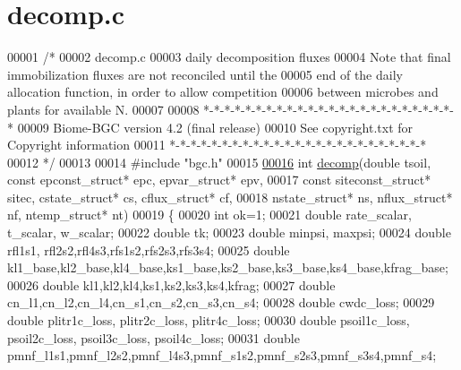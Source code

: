 \hypertarget{decomp_8c_source}{}\section{decomp.\+c}
\label{decomp_8c_source}

\begin{DoxyCode}
00001 \textcolor{comment}{/* }
00002 \textcolor{comment}{decomp.c}
00003 \textcolor{comment}{daily decomposition fluxes}
00004 \textcolor{comment}{Note that final immobilization fluxes are not reconciled until the}
00005 \textcolor{comment}{end of the daily allocation function, in order to allow competition}
00006 \textcolor{comment}{between microbes and plants for available N.}
00007 \textcolor{comment}{}
00008 \textcolor{comment}{*-*-*-*-*-*-*-*-*-*-*-*-*-*-*-*-*-*-*-*-*-*-*-*-*}
00009 \textcolor{comment}{Biome-BGC version 4.2 (final release)}
00010 \textcolor{comment}{See copyright.txt for Copyright information}
00011 \textcolor{comment}{*-*-*-*-*-*-*-*-*-*-*-*-*-*-*-*-*-*-*-*-*-*-*-*-*}
00012 \textcolor{comment}{*/}
00013 
00014 \textcolor{preprocessor}{#include "bgc.h"}
00015 
\hypertarget{decomp_8c_source_l00016}{}\hyperlink{decomp_8c_a5ce50023ade7c1dfcca146c06f3ba9da}{00016} \textcolor{keywordtype}{int} \hyperlink{decomp_8c_a5ce50023ade7c1dfcca146c06f3ba9da}{decomp}(\textcolor{keywordtype}{double} tsoil, \textcolor{keyword}{const} epconst\_struct* epc, epvar\_struct* epv, 
00017 \textcolor{keyword}{const} siteconst\_struct* sitec, cstate\_struct* cs, cflux\_struct* cf,
00018 nstate\_struct* ns, nflux\_struct* nf, ntemp\_struct* nt)
00019 \{
00020     \textcolor{keywordtype}{int} ok=1;
00021     \textcolor{keywordtype}{double} rate\_scalar, t\_scalar, w\_scalar;
00022     \textcolor{keywordtype}{double} tk;
00023     \textcolor{keywordtype}{double} minpsi, maxpsi;
00024     \textcolor{keywordtype}{double} rfl1s1, rfl2s2,rfl4s3,rfs1s2,rfs2s3,rfs3s4;
00025     \textcolor{keywordtype}{double} kl1\_base,kl2\_base,kl4\_base,ks1\_base,ks2\_base,ks3\_base,ks4\_base,kfrag\_base;
00026     \textcolor{keywordtype}{double} kl1,kl2,kl4,ks1,ks2,ks3,ks4,kfrag;
00027     \textcolor{keywordtype}{double} cn\_l1,cn\_l2,cn\_l4,cn\_s1,cn\_s2,cn\_s3,cn\_s4;
00028     \textcolor{keywordtype}{double} cwdc\_loss;
00029     \textcolor{keywordtype}{double} plitr1c\_loss, plitr2c\_loss, plitr4c\_loss;
00030     \textcolor{keywordtype}{double} psoil1c\_loss, psoil2c\_loss, psoil3c\_loss, psoil4c\_loss;
00031     \textcolor{keywordtype}{double} pmnf\_l1s1,pmnf\_l2s2,pmnf\_l4s3,pmnf\_s1s2,pmnf\_s2s3,pmnf\_s3s4,pmnf\_s4;

\end{DoxyCode}
